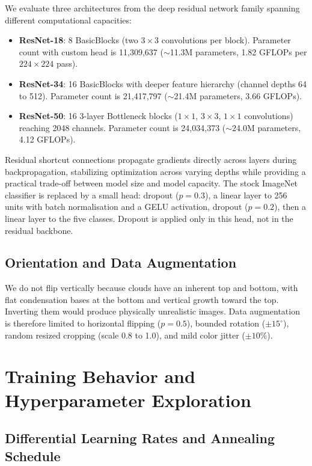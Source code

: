 \documentclass[11pt,a4paper]{article}
\begin{document}
We evaluate three architectures from the deep residual network family \cite{he2016deep} spanning different computational capacities:
\begin{itemize}
    \item \textbf{ResNet-18}: 8 BasicBlocks (two $3\times 3$ convolutions per block). Parameter count with custom head is 11,309,637 ($\sim$11.3M parameters, 1.82 GFLOPs per $224\times 224$ pass).
    \item \textbf{ResNet-34}: 16 BasicBlocks with deeper feature hierarchy (channel depths 64 to 512). Parameter count is 21,417,797 ($\sim$21.4M parameters, 3.66 GFLOPs).
    \item \textbf{ResNet-50}: 16 3-layer Bottleneck blocks ($1\times 1$, $3\times 3$, $1\times 1$ convolutions) reaching 2048 channels. Parameter count is 24,034,373 ($\sim$24.0M parameters, 4.12 GFLOPs).
\end{itemize}
Residual shortcut connections propagate gradients directly across layers during backpropagation, stabilizing optimization across varying depths while providing a practical trade-off between model size and model capacity. The stock ImageNet classifier is replaced by a small head: dropout ($p=0.3$), a linear layer to 256 units with batch normalisation and a GELU activation, dropout ($p=0.2$), then a linear layer to the five classes. Dropout is applied only in this head, not in the residual backbone.

\subsection{Orientation and Data Augmentation}

We do not flip vertically because clouds have an inherent top and bottom, with flat condensation bases at the bottom and vertical growth toward the top. Inverting them would produce physically unrealistic images. Data augmentation is therefore limited to horizontal flipping ($p=0.5$), bounded rotation ($\pm 15^\circ$), random resized cropping (scale 0.8 to 1.0), and mild color jitter ($\pm 10\%$).

\section{Training Behavior and Hyperparameter Exploration}
\label{sec:optimization}

\subsection{Differential Learning Rates and Annealing Schedule}
\end{document}
